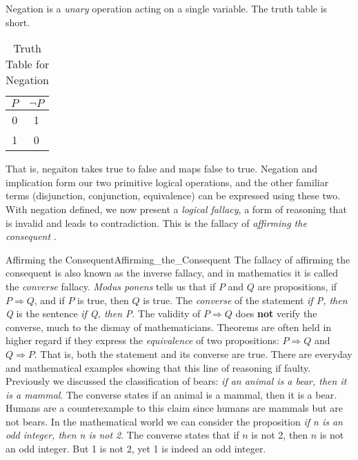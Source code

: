         Negation is a \textit{unary} operation acting on a single variable. The
        truth table is short.
        \begin{table}[H]
            \centering
            \captionsetup{type=table}
            \begin{tabular}{c|c}
                $P$&$\neg{P}$\\
                \hline
                0&1\\
                1&0
            \end{tabular}
            \caption{Truth Table for Negation}
            \label{tab:Truth_Table_Negation}
        \end{table}
        That is, negaiton takes true to false and maps false to true. Negation
        and implication form our two primitive logical operations, and the other
        familiar terms (disjunction, conjunction, equivalence) can be expressed
        using these two. With negation defined, we now present a
        \textit{logical fallacy}, a form of reasoning
        that is invalid and leads to contradiction. This is the fallacy of
        \textit{affirming the consequent}%
        .
        \begin{lexample}{Affirming the Consequent}{Affirming_the_Consequent}
            The fallacy of affirming the consequent is also known as the
            inverse fallacy, and in
            mathematics it is called the \textit{converse}
            fallacy.
            \textit{Modus ponens} tells us that if $P$ and $Q$ are propositions,
            if $P\Rightarrow{Q}$, and if $P$ is true, then $Q$ is true. The
            \textit{converse} of the statement
            \textit{if P, then Q} is the sentence \textit{if Q, then P}. The
            validity of $P\Rightarrow{Q}$ does \textbf{not} verify the converse,
            much to the dismay of mathematicians. Theorems are often held in
            higher regard if they express the \textit{equivalence} of two
            propositions: $P\Rightarrow{Q}$ and $Q\Rightarrow{P}$. That is, both
            the statement and its converse are true. There are everyday and
            mathematical examples showing that this line of reasoning if faulty.
            Previously we discussed the classification of bears:
            \textit{if an animal is a bear, then it is a mammal}. The converse
            states if an animal is a mammal, then it is a bear. Humans are a
            counterexample to this claim since humans are mammals but are not
            bears. In the mathematical world we can consider the proposition
            \textit{if n is an odd integer, then n is not 2}. The converse
            states that if $n$ is not 2, then $n$ is not an odd integer. But
            1 is not 2, yet 1 is indeed an odd integer.
        \end{lexample}
